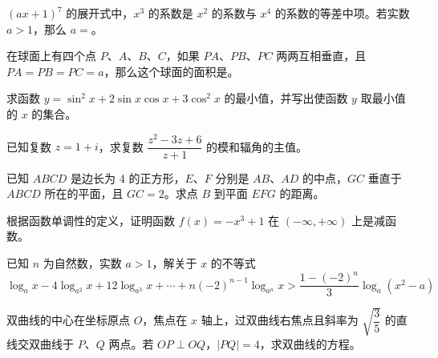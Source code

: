 \begin{question}

$(ax+1)^7$ 的展开式中，$x^3$ 的系数是 $x^2$ 的系数与 $x^4$ 的系数的等差中项。若实数 $a>1$，那么 $a=$\underline{\hspace{6em}}。

\end{question}
\begin{question}

在球面上有四个点 $P$、$A$、$B$、$C$，如果 $PA$、$PB$、$PC$ 两两互相垂直，且 $PA=PB=PC=a$，那么这个球面的面积是\underline{\hspace{6em}}。

\end{question}
\begin{question}

求函数 $y=\sin^2x+2\sin x\cos x+3\cos^2x$ 的最小值，并写出使函数 $y$ 取最小值的 $x$ 的集合。

\end{question}
\begin{question}

已知复数 $z=1+i$，求复数 $\dfrac{z^2-3z+6}{z+1}$ 的模和辐角的主值。

\end{question}
\begin{question}

已知 $ABCD$ 是边长为 4 的正方形，$E$、$F$ 分别是 $AB$、$AD$ 的中点，$GC$ 垂直于 $ABCD$ 所在的平面，且 $GC=2$。求点 $B$ 到平面 $EFG$ 的距离。

\end{question}
\begin{question}

根据函数单调性的定义，证明函数 $f(x)=-x^3+1$ 在 $(-\infty,+\infty)$ 上是减函数。

\end{question}
\begin{question}

已知 $n$ 为自然数，实数 $a>1$，解关于 $x$ 的不等式
\nopagebreak[4]
\[
\log_a x-4\log_{a^2}x+12\log_{a^3}x+\cdots+n(-2)^{n-1}\log_{a^n}x
>
\frac{1-(-2)^n}{3}\log_a(x^2-a)
\]

\end{question}
\begin{question}

双曲线的中心在坐标原点 $O$，焦点在 $x$ 轴上，过双曲线右焦点且斜率为 $\sqrt{\dfrac35}$ 的直线交双曲线于 $P$、$Q$ 两点。若 $OP\perp OQ$，$|PQ|=4$，求双曲线的方程。

\end{question}